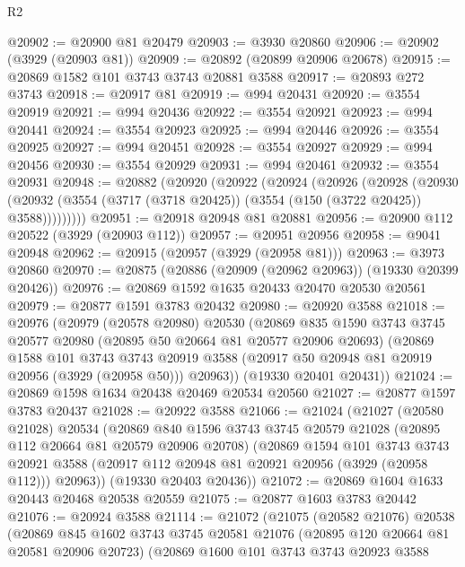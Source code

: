 \begin{lexlean}{R2}
\begin{coremodule}
@20902 := @20900 @81 @20479
@20903 := @3930 @20860
@20906 := @20902 (@3929 (@20903 @81))
@20909 := @20892 (@20899 @20906 @20678)
@20915 := @20869 @1582 @101 @3743 @3743 @20881 @3588
@20917 := @20893 @272 @3743
@20918 := @20917 @81
@20919 := @994 @20431
@20920 := @3554 @20919
@20921 := @994 @20436
@20922 := @3554 @20921
@20923 := @994 @20441
@20924 := @3554 @20923
@20925 := @994 @20446
@20926 := @3554 @20925
@20927 := @994 @20451
@20928 := @3554 @20927
@20929 := @994 @20456
@20930 := @3554 @20929
@20931 := @994 @20461
@20932 := @3554 @20931
@20948 := @20882
    (@20920
      (@20922
        (@20924
          (@20926
            (@20928
              (@20930
                (@20932 (@3554 (@3717 (@3718 @20425)) (@3554 (@150 (@3722 @20425)) @3588)))))))))
@20951 := @20918 @20948 @81 @20881
@20956 := @20900 @112 @20522 (@3929 (@20903 @112))
@20957 := @20951 @20956
@20958 := @9041 @20948
@20962 := @20915 (@20957 (@3929 (@20958 @81)))
@20963 := @3973 @20860
@20970 := @20875 (@20886 (@20909 (@20962 @20963)) (@19330 @20399 @20426))
@20976 := @20869 @1592 @1635 @20433 @20470 @20530 @20561
@20979 := @20877 @1591 @3783 @20432
@20980 := @20920 @3588
@21018 := @20976
    (@20979
      (@20578 @20980)
      @20530
      (@20869
        @835
        @1590
        @3743
        @3745
        @20577
        @20980
        (@20895 @50 @20664 @81 @20577 @20906 @20693)
        (@20869
          @1588
          @101
          @3743
          @3743
          @20919
          @3588
          (@20917 @50 @20948 @81 @20919 @20956 (@3929 (@20958 @50)))
          @20963))
      (@19330 @20401 @20431))
@21024 := @20869 @1598 @1634 @20438 @20469 @20534 @20560
@21027 := @20877 @1597 @3783 @20437
@21028 := @20922 @3588
@21066 := @21024
    (@21027
      (@20580 @21028)
      @20534
      (@20869
        @840
        @1596
        @3743
        @3745
        @20579
        @21028
        (@20895 @112 @20664 @81 @20579 @20906 @20708)
        (@20869
          @1594
          @101
          @3743
          @3743
          @20921
          @3588
          (@20917 @112 @20948 @81 @20921 @20956 (@3929 (@20958 @112)))
          @20963))
      (@19330 @20403 @20436))
@21072 := @20869 @1604 @1633 @20443 @20468 @20538 @20559
@21075 := @20877 @1603 @3783 @20442
@21076 := @20924 @3588
@21114 := @21072
    (@21075
      (@20582 @21076)
      @20538
      (@20869
        @845
        @1602
        @3743
        @3745
        @20581
        @21076
        (@20895 @120 @20664 @81 @20581 @20906 @20723)
        (@20869
          @1600
          @101
          @3743
          @3743
          @20923
          @3588

\end{coremodule}
\end{lexlean}
